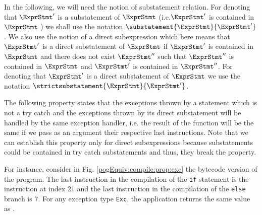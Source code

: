 




In the following,  we will need the notion of substatement relation.
 For denoting that  $\ExprStmt'$ is a substatement of  $\ExprStmt$ (i.e.$\ExprStmt'$ is contained in  $\ExprStmt$  )
we shall use the notation $\substatement{\ExprStmt }{\ExprStmt'}$. 
We also use the notion of a direct subexpression which here means that  $\ExprStmt'$ is a direct substatement of  $\ExprStmt$
if $\ExprStmt'$  is contained in $\ExprStmt$ 
and there does not exist  $\ExprStmt''$  such that  $\ExprStmt''$ is contained in   $\ExprStmt$ and  $\ExprStmt'$ is contained in  $\ExprStmt''$.
For denoting that  $\ExprStmt'$ is a direct substatement of  $\ExprStmt$
we use the notation $\strictsubstatement{\ExprStmt }{\ExprStmt'}$.



The following property states that the exceptions thrown by a 
statement which is not a try catch and the  exceptions thrown by its direct substatement
will be handled by the same exception handler, i.e. the result of the function \findExcHandler{}{}{} will be the same 
if we pass as an argument their respective last instructions. Note that we can establish this property only
for direct subexpressions because  substatements could be contained in try catch substatements and
 thus, they   break the property.

 For instance, consider in Fig. \ref{pogEquiv:compile:prop:exc} 
the bytecode version of the program. The last  instruction in the compilation of the \lstinline!if! statement is the 
instruction at index 21 and the last instruction in the compilation of the \lstinline!else! branch is 7. 
For any exception type \mbox{\rm\tt{Exc}}, the application  returns the same value  as
. 

